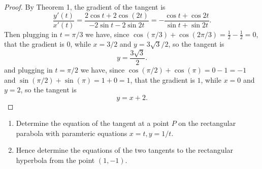 \begin{proof}
    By Theorem 1, the gradient of the tangent is 
    \[\frac{y'(t)}{x'(t)} = \frac{2\cos t + 2\cos(2t)}{-2\sin t - 2 \sin 2t}
    = -\frac{\cos t + \cos 2t}{\sin t + \sin 2t}.\]
    Then plugging in $t = \pi/3$ we have, since $\cos(\pi/3)+\cos(2\pi/3) = \tfrac12 - \tfrac12 = 0$,
    that the gradient is $0$, while $x = 3/2$ and $y = 3\sqrt{3}/2$, so the tangent is 
    \[y = \frac{3\sqrt{3}}{2}.\]   
    and plugging in $t = \pi/2$ we have, since $\cos(\pi/2)+\cos(\pi) = 0 - 1 = -1$ and $\sin(\pi/2)+\sin(\pi) = 1 + 0 = 1$, that the gradient is $1$, while $x = 0$ and $y = 2$, so the tangent is 
    \[y = x + 2.\]
\end{proof}

\begin{tcolorbox}[title=Problem 2, breakable]
    \begin{enumerate}
        \item Determine the equation of the tangent at a point $P$ on the rectangular parabola with 
        paramteric equations $x = t, y = 1/t$.
        \item Hence determine the equations of the two tangents to the rectangular hyperbola from the point $(1, -1)$.
    \end{enumerate}
\end{tcolorbox}